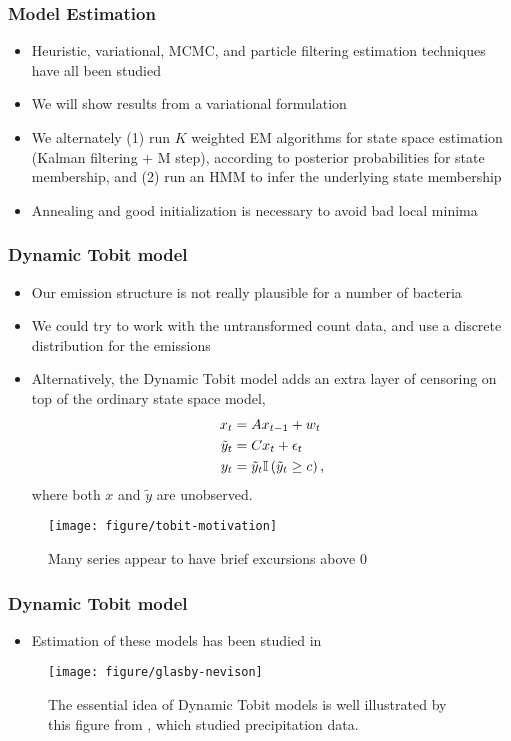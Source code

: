 \documentclass{beamer}
\begin{document}
\begin{frame}
  \frametitle{Model Estimation}
  \begin{itemize}
  \item Heuristic, variational, MCMC, and particle filtering estimation
    techniques have all been studied \citep{harrison1976bayesian, ghahramani2000variational, fruhwirth2001markov, doucet2001particle}
  \item We will show results from a variational formulation
  \item We alternately (1) run $K$ weighted EM algorithms for state space
    estimation (Kalman filtering + M step), according to posterior probabilities
    for state membership, and (2) run an HMM to infer the underlying state
    membership
  \item Annealing and good initialization is necessary to avoid bad local minima
  \end{itemize}
\end{frame}

\begin{frame}
  \frametitle{Dynamic Tobit model}
 \begin{itemize}
 \item Our emission structure is not really plausible for a number of bacteria
 \item We could try to work with the untransformed count data, and use a
   discrete distribution for the emissions
  \item Alternatively, the Dynamic Tobit model adds an extra layer of censoring
    on top of the ordinary state space model,
    \begin{align*}
      x_{t} &= Ax_{t - 1} + w_{t} \\
      \tilde{y}_{t} &= Cx_{t} + \epsilon_{t} \\
      y_{t} &= \tilde{y}_{t} \mathbb{I}\left({\tilde{y}_{t} \geq c}\right),
    \end{align*}
    where both $x$ and $\tilde{y}$ are unobserved.
 \end{itemize} 
\begin{figure}[ht]
  \centering
  \texttt{[image: figure/tobit-motivation]}
  \caption{Many series appear to have brief excursions above 0 \label{fig:label}}
\end{figure}
\end{frame}

\begin{frame}
  \frametitle{Dynamic Tobit model}
  \begin{itemize}
  \item Estimation of these models has been studied in \citep{chib1992bayes,
    manrique1998simulation, andrieu2002particle}
  \end{itemize}
 \begin{figure}[ht]
   \centering
   \texttt{[image: figure/glasby-nevison]}
   \caption{The essential idea of Dynamic Tobit models is well illustrated by
     this figure from \citep{glasbey1997rainfall}, which studied precipitation
     data. \label{fig:glasby-nevison}}
 \end{figure}
\end{frame}
\end{document}
